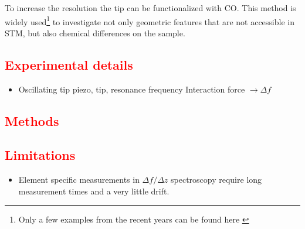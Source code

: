 To increase the resolution the tip can be functionalized with CO. This method is widely used\footnote{Only a few examples from the recent years can be found here \cite{albrecht_direct_2016, kawai_multiple_2018, kawai_atomically_2015, schulz_elemental_2018, gross_chemical_2009, pavlicek_generation_2017, schwarz_corrugation_2017}} to investigate not only geometric features that are not accessible in STM, but also chemical differences on the sample\cite{wang_exploration_2017}.

\subsection{\textcolor{red}{\textbf{Experimental details}}}
\begin{itemize}
	\item Oscillating tip
	\subitem piezo, tip, resonance frequency
	\subitem Interaction force $\rightarrow \Delta f$
\end{itemize}
\subsection{\textcolor{red}{\textbf{Methods}}}
\subsection{\textcolor{red}{\textbf{Limitations}}}
\begin{itemize}
	\item Element specific measurements in $\Delta f / \Delta z$ spectroscopy require long measurement times and a very little drift.
\end{itemize}